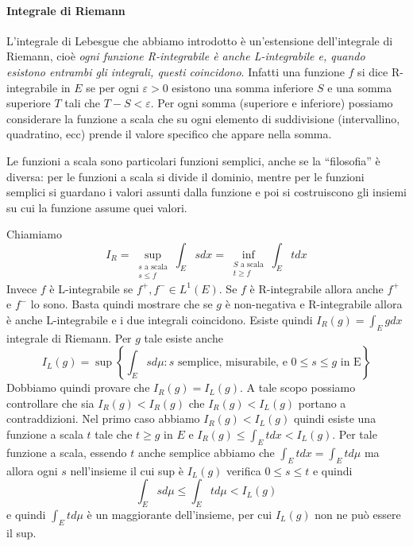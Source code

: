 \paragraph{Integrale di Riemann} L'integrale di Lebesgue che abbiamo introdotto
è un'estensione dell'integrale di Riemann, cioè \emph{ogni funzione
R-integrabile è anche L-integrabile e, quando esistono entrambi gli integrali, questi coincidono}. Infatti una
funzione \(f\) si dice R-integrabile in \(E\) se per ogni \(\varepsilon>0\)
esistono una somma inferiore \(S\) e una somma superiore \(T\) tali che \(T-S <
\varepsilon\). Per ogni somma (superiore e inferiore) possiamo considerare la
funzione a scala che su ogni elemento di suddivisione (intervallino, quadratino,
ecc) prende il valore specifico che appare nella somma.
\begin{remark}
    Le funzioni a scala sono particolari funzioni semplici, anche se la
    ``filosofia'' è diversa: per le funzioni a scala si divide il dominio,
    mentre per le funzioni semplici si guardano i valori assunti dalla funzione
    e poi si costruiscono gli insiemi su cui la funzione assume quei valori.
\end{remark}
Chiamiamo 
\[
    I_R = \sup_{\substack{s\text{ a scala} \\ s \le f}} \int_{E} s dx = 
    \inf_{\substack{S\text{ a scala} \\ t \ge f}} \int_{E} t dx
\]
Invece \(f\) è L-integrabile se \(f^{+}, f^{-} \in L^{1}{(E)}\). Se \(f\) è
R-integrabile allora anche \(f^{+}\) e \(f^{-}\) lo sono. Basta quindi mostrare
che se \(g\) è non-negativa e R-integrabile allora è anche L-integrabile e i due
integrali coincidono. Esiste quindi \(I_R{(g)} = \int_{E} g dx\) integrale di
Riemann. Per \(g\) tale esiste anche \[I_L{(g)} = \sup \left\{\int_E s d\mu : s
\text{ semplice, misurabile, e } 0\le s\le g \text{ in E} \right\} \] Dobbiamo
quindi provare che \(I_R{(g)} = I_L{(g)}\). A tale scopo possiamo controllare
che sia \(I_R{(g)} < I_R{(g)}\) che \(I_R{(g)} < I_L{(g)}\) portano a
contraddizioni. Nel primo caso abbiamo \(I_R{(g)} < I_L{(g)}\) quindi esiste una
funzione a scala \(t\) tale che \(t \ge g\) in \(E\) e \(I_R{(g)} \le  \int_E t dx
< I_L{(g)}\). Per tale funzione a scala, essendo \(t\) anche semplice abbiamo
che \(\int_E t dx = \int_E t d\mu\) ma allora ogni \(s\) nell'insieme il cui sup
è \(I_L{(g)}\) verifica \(0 \le s\le t\) e quindi
\[
    \int_E s d\mu \le \int_E t d\mu < I_L{(g)}
\]
e quindi \(\int_E t d\mu\) è un maggiorante dell'insieme, per cui \(I_L{(g)}\)
non ne può essere il sup.

